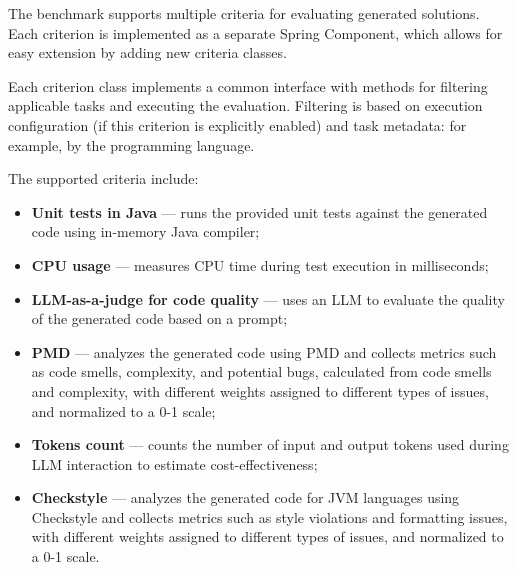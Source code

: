 The benchmark supports multiple criteria for evaluating generated solutions.
Each criterion is implemented as a separate Spring Component, which allows for easy extension by adding new criteria classes.

Each criterion class implements a common interface with methods for filtering applicable tasks and executing the evaluation.
Filtering is based on execution configuration (if this criterion is explicitly enabled) and task metadata: for example, by the programming language.

The supported criteria include:
\begin{itemize}
    \item \textbf{Unit tests in Java} --- runs the provided unit tests against the generated code using in-memory Java compiler;
    \item \textbf{CPU usage} --- measures CPU time during test execution in milliseconds;
    \item \textbf{LLM-as-a-judge for code quality} --- uses an LLM to evaluate the quality of the generated code based on a prompt;
    \item \textbf{PMD} --- analyzes the generated code using PMD and collects metrics such as code smells, complexity, and potential bugs, calculated from code smells and complexity, with different weights assigned to different types of issues, and normalized to a 0-1 scale;
    \item \textbf{Tokens count} --- counts the number of input and output tokens used during LLM interaction to estimate cost-effectiveness;
    \item \textbf{Checkstyle} --- analyzes the generated code for JVM languages using Checkstyle and collects metrics such as style violations and formatting issues, with different weights assigned to different types of issues, and normalized to a 0-1 scale.
\end{itemize}

